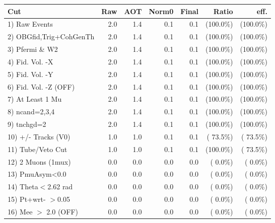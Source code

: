  \begin{table}[h!]\centering
 \begin{tabular}{||l||r|r|r|r|r|r||}
 \hline
 \hline
 Cut & Raw & AOT & Norm0 & Final & Ratio & eff.       \\
 \hline
  1) Raw Events           &          2.0 &          1.4 &          0.1 &          0.1 & (100.0\%) & (100.0\%) \\
  2) OBGfid,Trig+CohGenTh &          2.0 &          1.4 &          0.1 &          0.1 & (100.0\%) & (100.0\%) \\
  3) Pfermi \& W2         &          2.0 &          1.4 &          0.1 &          0.1 & (100.0\%) & (100.0\%) \\
  4) Fid. Vol. -X         &          2.0 &          1.4 &          0.1 &          0.1 & (100.0\%) & (100.0\%) \\
  5) Fid. Vol. -Y         &          2.0 &          1.4 &          0.1 &          0.1 & (100.0\%) & (100.0\%) \\
  6) Fid. Vol. -Z (OFF)   &          2.0 &          1.4 &          0.1 &          0.1 & (100.0\%) & (100.0\%) \\
  7) At Least 1 Mu        &          2.0 &          1.4 &          0.1 &          0.1 & (100.0\%) & (100.0\%) \\
  8) ncand=2,3,4          &          2.0 &          1.4 &          0.1 &          0.1 & (100.0\%) & (100.0\%) \\
  9) tnchgd=2             &          2.0 &          1.4 &          0.1 &          0.1 & (100.0\%) & (100.0\%) \\
 10) +/- Tracks (V0)      &          1.0 &          1.0 &          0.1 &          0.1 & ( 73.5\%) & ( 73.5\%) \\
 11) Tube/Veto Cut        &          1.0 &          1.0 &          0.1 &          0.1 & (100.0\%) & ( 73.5\%) \\
 12) 2 Muons (1mux)       &          0.0 &          0.0 &          0.0 &          0.0 & (  0.0\%) & (  0.0\%) \\
 13) PmuAsym<0.0          &          0.0 &          0.0 &          0.0 &          0.0 & (  0.0\%) & (  0.0\%) \\
 14) Theta$<$2.62 rad     &          0.0 &          0.0 &          0.0 &          0.0 & (  0.0\%) & (  0.0\%) \\
 15) Pt+wrt- $>$0.05      &          0.0 &          0.0 &          0.0 &          0.0 & (  0.0\%) & (  0.0\%) \\
 16) Mee $>$ 2.0  (OFF)   &          0.0 &          0.0 &          0.0 &          0.0 & (  0.0\%) & (  0.0\%) \\

\end{tabular}
\end{table}
